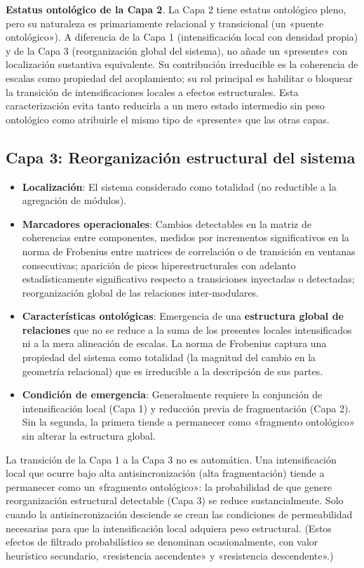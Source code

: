 \textbf{Estatus ontológico de la Capa 2}. La Capa 2 tiene estatus ontológico pleno, pero su naturaleza es primariamente relacional y transicional (un «puente ontológico»). A diferencia de la Capa 1 (intensificación local con densidad propia) y de la Capa 3 (reorganización global del sistema), no añade un «presente» con localización sustantiva equivalente. Su contribución irreducible es la coherencia de escalas como propiedad del acoplamiento; su rol principal es habilitar o bloquear la transición de intensificaciones locales a efectos estructurales. Esta caracterización evita tanto reducirla a un mero estado intermedio sin peso ontológico como atribuirle el mismo tipo de «presente» que las otras capas.

\subsection{Capa 3: Reorganización estructural del sistema}

\begin{itemize}
    \item \textbf{Localización}: El sistema considerado como totalidad (no reductible a la agregación de módulos).
    \item \textbf{Marcadores operacionales}: Cambios detectables en la matriz de coherencias entre componentes, medidos por incrementos significativos en la norma de Frobenius entre matrices de correlación o de transición en ventanas consecutivas; aparición de picos hiperestructurales con adelanto estadísticamente significativo respecto a transiciones inyectadas o detectadas; reorganización global de las relaciones inter-modulares.
    \item \textbf{Características ontológicas}: Emergencia de una \textbf{estructura global de relaciones} que no se reduce a la suma de los presentes locales intensificados ni a la mera alineación de escalas. La norma de Frobenius captura una propiedad del sistema como totalidad (la magnitud del cambio en la geometría relacional) que es irreducible a la descripción de sus partes.
    \item \textbf{Condición de emergencia}: Generalmente requiere la conjunción de intensificación local (Capa 1) y reducción previa de fragmentación (Capa 2). Sin la segunda, la primera tiende a permanecer como «fragmento ontológico» sin alterar la estructura global.
\end{itemize}

\begin{importantbox}
La transición de la Capa 1 a la Capa 3 no es automática. Una intensificación local que ocurre bajo alta antisincronización (alta fragmentación) tiende a permanecer como un «fragmento ontológico»: la probabilidad de que genere reorganización estructural detectable (Capa 3) se reduce sustancialmente. Solo cuando la antisincronización desciende se crean las condiciones de permeabilidad necesarias para que la intensificación local adquiera peso estructural. (Estos efectos de filtrado probabilístico se denominan ocasionalmente, con valor heurístico secundario, «resistencia ascendente» y «resistencia descendente».)
\end{importantbox}


